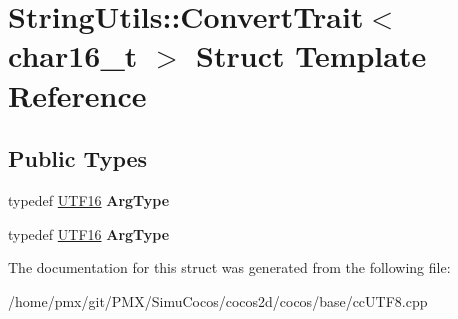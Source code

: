 \hypertarget{structStringUtils_1_1ConvertTrait_3_01char16__t_01_4}{}\section{String\+Utils\+:\+:Convert\+Trait$<$ char16\+\_\+t $>$ Struct Template Reference}
\label{structStringUtils_1_1ConvertTrait_3_01char16__t_01_4}
\subsection*{Public Types}
\begin{DoxyCompactItemize}
\item 
\mbox{\label{structStringUtils_1_1ConvertTrait_3_01char16__t_01_4_a64287f835946851bb1288a75fa1a6a88}} 
typedef \hyperlink{structUTF16}{U\+T\+F16} {\bfseries Arg\+Type}
\item 
\mbox{\label{structStringUtils_1_1ConvertTrait_3_01char16__t_01_4_a64287f835946851bb1288a75fa1a6a88}} 
typedef \hyperlink{structUTF16}{U\+T\+F16} {\bfseries Arg\+Type}
\end{DoxyCompactItemize}


The documentation for this struct was generated from the following file\+:\begin{DoxyCompactItemize}
\item 
/home/pmx/git/\+P\+M\+X/\+Simu\+Cocos/cocos2d/cocos/base/cc\+U\+T\+F8.\+cpp\end{DoxyCompactItemize}
